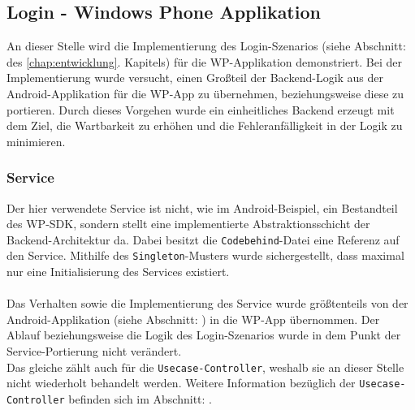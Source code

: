 \documentclass[Bachelorarbeit.tex]{subfiles}
\begin{document}

\subsection*{Login - Windows Phone Applikation}\label{subsec:login-wp}
An dieser Stelle wird die Implementierung des Login-Szenarios (siehe Abschnitt:  des \ref{chap:entwicklung}. Kapitels)  für die \ac{WP}-Applikation demonstriert. 
Bei der Implementierung wurde versucht, einen Großteil der Backend-Logik aus der Android-Applikation für die \ac{WP}-App zu übernehmen, beziehungsweise diese zu portieren.
Durch dieses Vorgehen wurde ein einheitliches Backend erzeugt mit dem Ziel, die Wartbarkeit zu erhöhen und die Fehleranfälligkeit in der Logik zu minimieren. \\

\subsubsection*{Service}
Der hier verwendete Service ist nicht, wie im Android-Beispiel, ein Bestandteil des \ac{WP}-\ac{SDK}, sondern stellt eine implementierte Abstraktionsschicht der Backend-Architektur da.
Dabei besitzt die \texttt{Codebehind}-Datei eine Referenz auf den Service.
Mithilfe des \texttt{Singleton}-Musters wurde sichergestellt, dass maximal nur eine Initialisierung des Services existiert. \\
\\
Das Verhalten sowie die Implementierung des Service wurde größtenteils von der Android-Applikation (siehe Abschnitt: ) in die \ac{WP}-App übernommen.
Der Ablauf beziehungsweise die Logik des Login-Szenarios wurde in dem Punkt der Service-Portierung nicht verändert.\\
Das gleiche zählt auch für die \texttt{Usecase-Controller}, weshalb sie an dieser Stelle nicht wiederholt behandelt werden.
Weitere Information  bezüglich der \texttt{Usecase-Controller} befinden sich im Abschnitt: .
\end{document}
